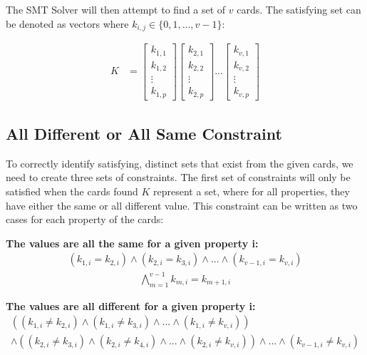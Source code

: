 \documentclass[pageno]{jpaper}
\begin{document}
The SMT Solver will then attempt to find a set of $v$ cards. The satisfying set can be denoted as vectors where $k_{i,j} \in \{0,1, ... , v-1\}$:

\begin{align}
    K &= \begin{bmatrix}
           k_{1,1} \\
           k_{1,2} \\
           \vdots \\
           k_{1,p}
         \end{bmatrix}
         \begin{bmatrix}
           k_{2,1} \\
           k_{2,2} \\
           \vdots \\
           k_{2,p}
         \end{bmatrix} ... 
          \begin{bmatrix}
           k_{v,1} \\
           k_{v,2} \\
           \vdots \\
           k_{v,p}
         \end{bmatrix}
  \end{align}

\subsection{All Different or All Same Constraint}
To correctly identify satisfying, distinct sets that exist from the given cards, we need to create three sets of constraints. The first set of constraints will only be satisfied when the cards found $K$ represent a set, where for all properties, they have either the same or all different value. This constraint can be written as two cases for each property of the cards:

\textbf{The values are all the same for a given property i:} 
\begin{align}
	(k_{1,i} = k_{2,i}) \wedge (k_{2,i} = k_{3,i}) \wedge ... \wedge (k_{v-1,i} = k_{v,i})
\end{align}
\begin{align}
	\bigwedge \limits_{m=1}^{v-1} k_{m,i} = k_{m+1,i}
\end{align}

\textbf{The values are all different for a given property i:}
\begin{multline}
	((k_{1,i} \neq k_{2,i}) \wedge (k_{1,i} \neq k_{3,i}) \wedge ... \wedge (k_{1,i} \neq k_{v,i})) \\
	 \wedge ((k_{2,i} \neq k_{3,i}) \wedge (k_{2,i} \neq k_{4,i}) \wedge ... \wedge (k_{2,i} \neq k_{v,i})) \wedge 
	 ... \wedge (k_{v-1,i} \neq k_{v,i})
\end{multline}
\end{document}
